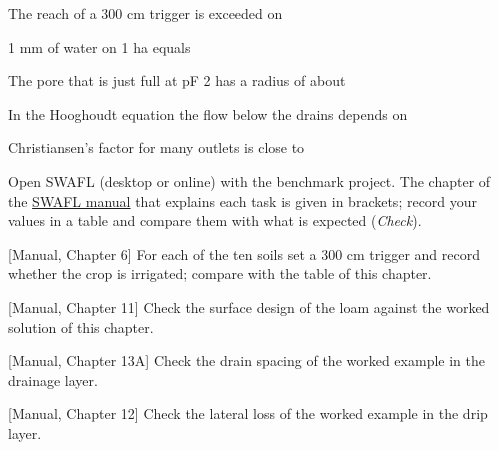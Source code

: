 \begin{exlist}
\item The reach of a 300 cm trigger is exceeded on
\item 1 mm of water on 1 ha equals
\item The pore that is just full at pF 2 has a radius of about
\item In the Hooghoudt equation the flow below the drains depends on
\item Christiansen's factor for many outlets is close to
\end{exlist}
{\small Open SWAFL (desktop or online) with the benchmark project. The chapter of the \href{https://github.com/halilunaziru73-creator/Coupled-Water-Fluxes-Pore-Scale-Dynamics-Precision-Irrigation-Mulching-Feedback-Loops/raw/main/Software/v1.1.0/SWAFL_Desktop/docs/manual_v1.1.0/SWAFL_Manual_v1.1.0.pdf}{SWAFL manual} that explains each task is given in brackets; record your values in a table and compare them with what is expected (\emph{Check}).}\par\vspace{3pt}
\begin{exlist}
\item {\color{khblue}[Manual, Chapter 6]} For each of the ten soils set a 300 cm trigger and record whether the crop is irrigated; compare with the table of this chapter.\par{}
\item {\color{khblue}[Manual, Chapter 11]} Check the surface design of the loam against the worked solution of this chapter.\par{}
\item {\color{khblue}[Manual, Chapter 13A]} Check the drain spacing of the worked example in the drainage layer.\par{}
\item {\color{khblue}[Manual, Chapter 12]} Check the lateral loss of the worked example in the drip layer.\par{}
\end{exlist}
